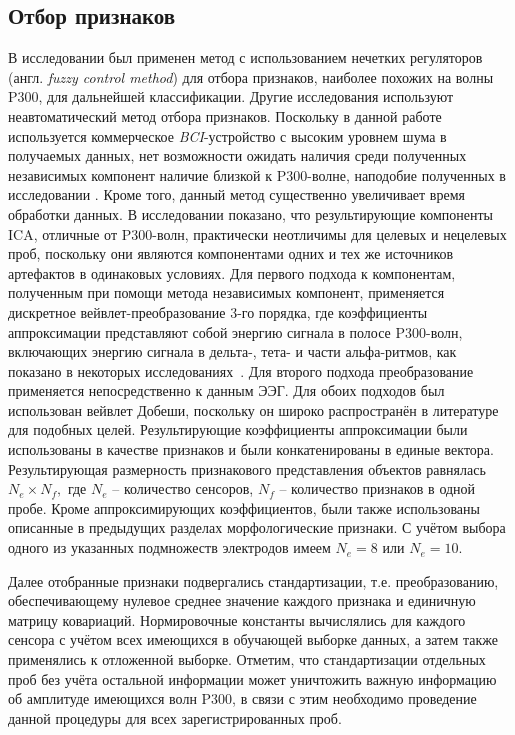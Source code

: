 \documentclass[12pt,a4paper,oneside,fleqn,leqno]{article}
\begin{document}
	\subsection{Отбор признаков}
	\par В исследовании \cite{Piccione} был применен метод с использованием нечетких регуляторов (англ. {\it fuzzy control method}) для отбора признаков, наиболее похожих на волны P300, для дальнейшей классификации. Другие исследования используют неавтоматический метод отбора признаков. Поскольку в данной работе используется коммерческое {\it BCI}-устройство с высоким уровнем шума в получаемых данных, нет возможности ожидать наличия среди полученных независимых компонент наличие близкой к P300-волне, наподобие полученных в исследовании \cite{Piccione}. Кроме того, данный метод существенно увеличивает время обработки данных. В исследовании \cite{James} показано, что результирующие компоненты ICA, отличные от P300-волн, практически неотличимы для целевых и нецелевых проб, поскольку они являются компонентами одних и тех же источников артефактов в одинаковых условиях. Для первого подхода к компонентам, полученным при помощи метода независимых компонент, применяется дискретное вейвлет-преобразование 3-го порядка, где коэффициенты аппроксимации представляют собой  энергию сигнала в полосе P300-волн, включающих энергию сигнала в дельта-, тета- и части альфа-ритмов, как показано в некоторых исследованиях~\cite{alco}. Для второго подхода преобразование применяется непосредственно к данным ЭЭГ. Для обоих подходов был использован вейвлет Добеши, поскольку он широко распространён в литературе для подобных целей. Результирующие коэффициенты аппроксимации были использованы в качестве признаков и были конкатенированы в единые вектора. Результирующая размерность признакового представления объектов равнялась $N_e \times N_f,$ где $N_e$ -- количество сенсоров, $N_f$ -- количество признаков в одной пробе. Кроме аппроксимирующих коэффициентов, были также использованы описанные в предыдущих разделах морфологические признаки. С учётом выбора одного из указанных подмножеств электродов имеем $N_e = 8$ или $N_e = 10.$
	\par Далее отобранные признаки подвергались стандартизации, т.е. преобразованию, обеспечивающему нулевое среднее значение каждого признака и единичную матрицу ковариаций. Нормировочные константы вычислялись для каждого сенсора с учётом всех имеющихся в обучающей выборке данных, а затем также применялись к отложенной выборке. Отметим, что стандартизации отдельных проб без учёта остальной информации может уничтожить важную информацию об амплитуде имеющихся волн P300, в связи с этим необходимо проведение данной процедуры для всех зарегистрированных проб.
\end{document}
